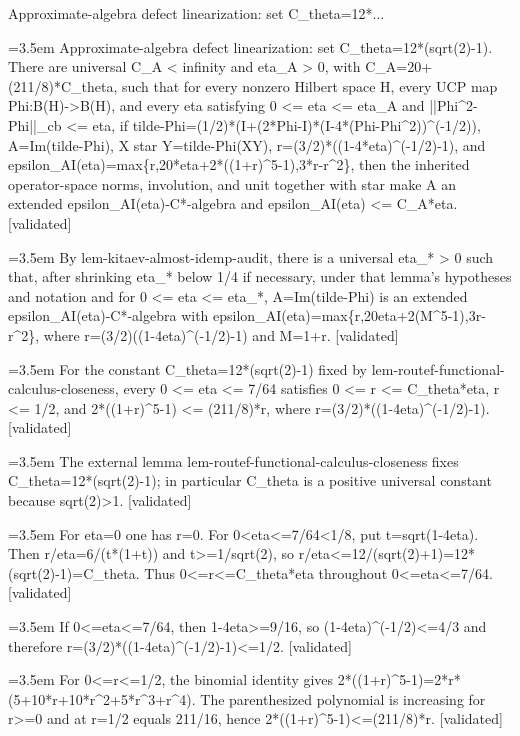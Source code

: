 \documentclass{article}
\newcommand{\step}[1]{\par\noindent\hangindent=3.5em\hangafter=1%
  \makebox[3.5em][l]{\textbf{#1.}}}
\newcommand{\steptag}[1]{\hfill{\small\textsf{[#1]}}}
\begin{document}
\begin{proofbox}{Approximate-algebra defect linearization: set C\_theta=12*...}
\step{1} Approximate-algebra defect linearization: set C\_theta=12*(sqrt(2)-1). There are universal C\_A < infinity and eta\_A > 0, with C\_A=20+(211/8)*C\_theta, such that for every nonzero Hilbert space H, every UCP map Phi:B(H)->B(H), and every eta satisfying 0 <= eta <= eta\_A and ||Phi\textasciicircum{}2-Phi||\_cb <= eta, if tilde-Phi=(1/2)*(I+(2*Phi-I)*(I-4*(Phi-Phi\textasciicircum{}2))\textasciicircum{}(-1/2)), A=Im(tilde-Phi), X star Y=tilde-Phi(XY), r=(3/2)*((1-4*eta)\textasciicircum{}(-1/2)-1), and epsilon\_AI(eta)=max\{r,20*eta+2*((1+r)\textasciicircum{}5-1),3*r-r\textasciicircum{}2\}, then the inherited operator-space norms, involution, and unit together with star make A an extended epsilon\_AI(eta)-C*-algebra and epsilon\_AI(eta) <= C\_A*eta. \steptag{validated} \\[6pt]
\step{1.1} By lem-kitaev-almost-idemp-audit, there is a universal eta\_* > 0 such that, after shrinking eta\_* below 1/4 if necessary, under that lemma's hypotheses and notation and for 0 <= eta <= eta\_*, A=Im(tilde-Phi) is an extended epsilon\_AI(eta)-C*-algebra with epsilon\_AI(eta)=max\{r,20eta+2(M\textasciicircum{}5-1),3r-r\textasciicircum{}2\}, where r=(3/2)((1-4eta)\textasciicircum{}(-1/2)-1) and M=1+r. \steptag{validated} \\[4pt]
\step{1.2} For the constant C\_theta=12*(sqrt(2)-1) fixed by lem-routef-functional-calculus-closeness, every 0 <= eta <= 7/64 satisfies 0 <= r <= C\_theta*eta, r <= 1/2, and 2*((1+r)\textasciicircum{}5-1) <= (211/8)*r, where r=(3/2)*((1-4eta)\textasciicircum{}(-1/2)-1). \steptag{validated} \\[6pt]
\step{1.2.1} The external lemma lem-routef-functional-calculus-closeness fixes C\_theta=12*(sqrt(2)-1); in particular C\_theta is a positive universal constant because sqrt(2)>1. \steptag{validated} \\[4pt]
\step{1.2.2} For eta=0 one has r=0. For 0<eta<=7/64<1/8, put t=sqrt(1-4eta). Then r/eta=6/(t*(1+t)) and t>=1/sqrt(2), so r/eta<=12/(sqrt(2)+1)=12*(sqrt(2)-1)=C\_theta. Thus 0<=r<=C\_theta*eta throughout 0<=eta<=7/64. \steptag{validated} \\[4pt]
\step{1.2.3} If 0<=eta<=7/64, then 1-4eta>=9/16, so (1-4eta)\textasciicircum{}(-1/2)<=4/3 and therefore r=(3/2)*((1-4eta)\textasciicircum{}(-1/2)-1)<=1/2. \steptag{validated} \\[4pt]
\step{1.2.4} For 0<=r<=1/2, the binomial identity gives 2*((1+r)\textasciicircum{}5-1)=2*r*(5+10*r+10*r\textasciicircum{}2+5*r\textasciicircum{}3+r\textasciicircum{}4). The parenthesized polynomial is increasing for r>=0 and at r=1/2 equals 211/16, hence 2*((1+r)\textasciicircum{}5-1)<=(211/8)*r. \steptag{validated} \\[4pt]

\end{proofbox}
\end{document}
